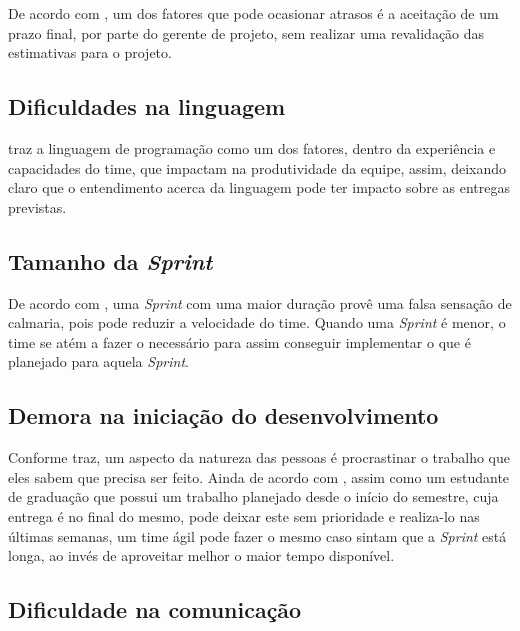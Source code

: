   De acordo com \cite{leo2013}, um dos fatores que pode ocasionar atrasos é a aceitação de um prazo final, por parte do gerente
  de projeto, sem realizar uma revalidação das estimativas para o projeto.

  \subsection{Dificuldades na linguagem}

  \cite{melo2011} traz a linguagem de programação como um dos fatores, dentro da experiência e capacidades do time, que impactam
  na produtividade da equipe, assim, deixando claro que o entendimento acerca da linguagem pode ter impacto sobre as entregas
  previstas.

  \subsection{Tamanho da \textit{Sprint}}

  De acordo com \cite{cogn2011}, uma \textit{Sprint} com uma maior duração provê uma falsa sensação de calmaria, pois pode reduzir
  a velocidade do time. Quando uma \textit{Sprint} é menor, o time se atém a fazer o necessário para assim conseguir implementar
  o que é planejado para aquela \textit{Sprint}.


  \subsection{Demora na iniciação do desenvolvimento}

  Conforme \cite{cogn2011} traz, um aspecto da natureza das pessoas é procrastinar o trabalho que eles sabem que precisa ser
  feito. Ainda de acordo com \cite{cogn2011}, assim como um estudante de graduação que possui um trabalho planejado desde o início do semestre, cuja entrega é no
  final do mesmo, pode deixar este sem prioridade e realiza-lo nas últimas semanas, um time ágil pode fazer o mesmo caso sintam
  que a \textit{Sprint} está longa, ao invés de aproveitar melhor o maior tempo disponível.

  \subsection{Dificuldade na comunicação}

